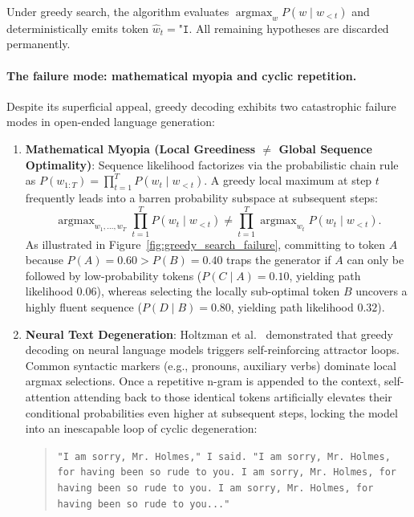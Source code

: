 \documentclass[../../main.tex]{subfiles}
\begin{document}
Under greedy search, the algorithm evaluates $\operatorname{argmax}_w P(w \mid w_{<t})$ and deterministically emits token $\hat{w}_t = \texttt{"I}$. All remaining hypotheses are discarded permanently.

\paragraph{The failure mode: mathematical myopia and cyclic repetition.}
Despite its superficial appeal, greedy decoding exhibits two catastrophic failure modes in open-ended language generation:
\begin{enumerate}
    \item \textbf{Mathematical Myopia (Local Greediness $\neq$ Global Sequence Optimality)}: Sequence likelihood factorizes via the probabilistic chain rule as $P(w_{1:T}) = \prod_{t=1}^T P(w_t \mid w_{<t})$. A greedy local maximum at step $t$ frequently leads into a barren probability subspace at subsequent steps:
    \begin{equation}
    \label{eq:greedy_myopia_divergence}
    \operatorname{argmax}_{w_1, \dots, w_T} \prod_{t=1}^T P(w_t \mid w_{<t}) \ne \prod_{t=1}^T \operatorname{argmax}_{w_t} P(w_t \mid w_{<t}).
    \end{equation}
    As illustrated in Figure~\ref{fig:greedy_search_failure}, committing to token $A$ because $P(A) = 0.60 > P(B) = 0.40$ traps the generator if $A$ can only be followed by low-probability tokens ($P(C \mid A) = 0.10$, yielding path likelihood $0.06$), whereas selecting the locally sub-optimal token $B$ uncovers a highly fluent sequence ($P(D \mid B) = 0.80$, yielding path likelihood $0.32$).
    \item \textbf{Neural Text Degeneration}: Holtzman et al.~\cite{holtzman2020} demonstrated that greedy decoding on neural language models triggers self-reinforcing attractor loops. Common syntactic markers (e.g., pronouns, auxiliary verbs) dominate local argmax selections. Once a repetitive n-gram is appended to the context, self-attention attending back to those identical tokens artificially elevates their conditional probabilities even higher at subsequent steps, locking the model into an inescapable loop of cyclic degeneration:
    \begin{quote}
    \texttt{"I am sorry, Mr. Holmes," I said. "I am sorry, Mr. Holmes, for having been so rude to you. I am sorry, Mr. Holmes, for having been so rude to you. I am sorry, Mr. Holmes, for having been so rude to you..."}
    \end{quote}
\end{enumerate}
\end{document}
